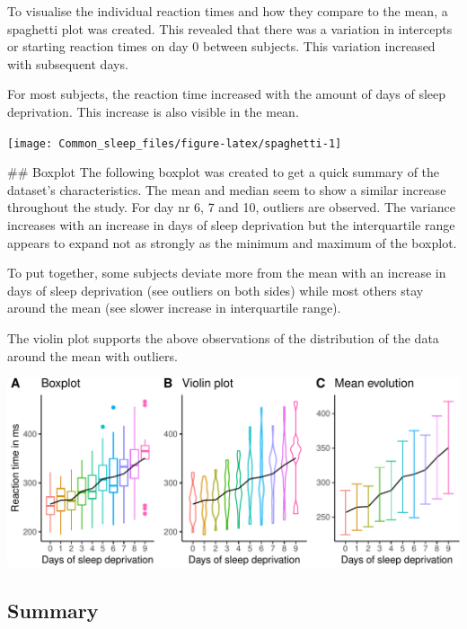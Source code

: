 \documentclass[
]{article}
\begin{document}
To visualise the individual reaction times and how they compare to the
mean, a spaghetti plot was created. This revealed that there was a
variation in intercepts or starting reaction times on day 0 between
subjects. This variation increased with subsequent days.

For most subjects, the reaction time increased with the amount of days
of sleep deprivation. This increase is also visible in the mean.

\begin{center}\texttt{[image: Common\_sleep\_files/figure-latex/spaghetti-1]} \end{center}

## Boxplot
The following boxplot was created to get a quick summary of the dataset's characteristics. 
The mean and median seem to show a similar increase throughout the study. 
For day nr 6, 7 and 10, outliers are observed.  
The variance increases with an increase in days of sleep deprivation but the interquartile range appears to expand not as strongly as the minimum and maximum of the boxplot. 

To put together, some subjects deviate more from the mean with an increase in days of sleep deprivation (see outliers on both sides)  while most others stay around the mean (see slower increase in interquartile range). 

The violin plot supports the above observations of the distribution of the data around the mean with outliers.


\begin{center}\includegraphics[width=0.8\linewidth]{Common_sleep_files/figure-latex/boxplot-1} \end{center}

\hypertarget{summary}{%
\subsection{Summary}\label{summary}}
\end{document}
